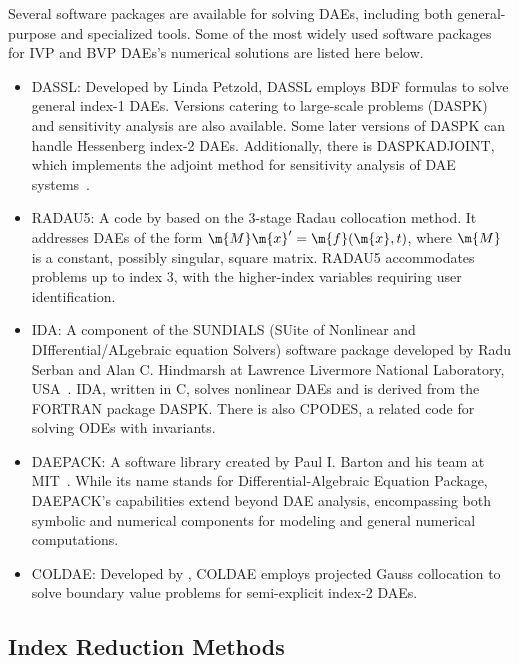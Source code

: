 Several software packages are available for solving \acp{DAE}, including both general-purpose and specialized tools. Some of the most widely used software packages for \ac{IVP} and \ac{BVP} \acp{DAE}'s numerical solutions are listed here below.
%
\begin{itemize}
  \setlength{\itemsep}{0.0em}
  \item DASSL: Developed by Linda Petzold, DASSL employs \ac{BDF} formulas to solve general index-1 \acp{DAE}. Versions catering to large-scale problems (DASPK) and sensitivity analysis are also available. Some later versions of DASPK can handle Hessenberg index-2 \acp{DAE}. Additionally, there is DASPKADJOINT, which implements the adjoint method for sensitivity analysis of \ac{DAE} systems~\cite{brenan1995numerical}.
  \item RADAU5: A code by \citet{hairer1999stiff} based on the 3-stage Radau collocation method. It addresses \acp{DAE} of the form $\m{M}\m{x}^{\prime} = \m{f}(\m{x}, t)$, where $\m{M}$ is a constant, possibly singular, square matrix. RADAU5 accommodates problems up to index 3, with the higher-index variables requiring user identification.
  \item IDA: A component of the SUNDIALS (SUite of Nonlinear and DIfferential/ALgebraic equation Solvers) software package developed by Radu Serban and Alan C. Hindmarsh at Lawrence Livermore National Laboratory, USA~\cite{hindmarsh2005sundials, gardner2022sundials}. IDA, written in C, solves nonlinear \acp{DAE} and is derived from the FORTRAN package DASPK. There is also CPODES, a related code for solving \acp{ODE} with invariants.
  \item DAEPACK: A software library created by Paul I. Barton and his team at \ac{MIT}~\cite{tolsma2000daepack}. While its name stands for Differential-Algebraic Equation Package, DAEPACK's capabilities extend beyond \ac{DAE} analysis, encompassing both symbolic and numerical components for modeling and general numerical computations.
  \item COLDAE: Developed by \citet{ascher1994collocation}, COLDAE employs projected Gauss collocation to solve boundary value problems for semi-explicit index-2 \acp{DAE}.
\end{itemize}

\subsection{Index Reduction Methods}

